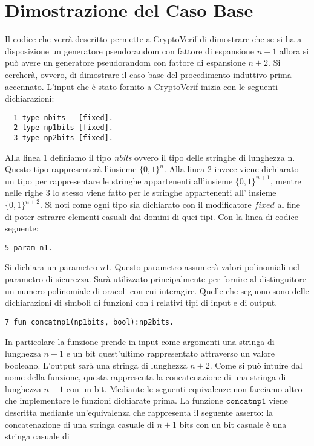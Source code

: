 \documentclass[a4paper,openright,twoside,12pt]{report}
\begin{document}
\newpage
\section{Dimostrazione del Caso Base}
Il codice che verr\`a descritto permette a CryptoVerif di dimostrare che se si ha a disposizione un generatore pseudorandom con fattore
di espansione $n+1$ allora si pu\`o avere un generatore pseudorandom con fattore di espansione $n+2$. 
Si cercher\`a, ovvero, di dimostrare il caso base del procedimento induttivo prima accennato.
L'input che \`e stato fornito a CryptoVerif inizia con le seguenti dichiarazioni:
\begin{verbatim}
  1 type nbits 	 [fixed].     
  2 type np1bits [fixed].   
  3 type np2bits [fixed].   
\end{verbatim}
Alla linea 1 definiamo il tipo \emph{nbits} ovvero il tipo delle stringhe di lunghezza n. Questo tipo rappresenter\`a l'insieme $\{0, 1\}^n$. Alla linea 2 invece viene dichiarato un tipo
per rappresentare le stringhe appartenenti all'insieme $\{0, 1\}^{n+1}$, mentre nelle righe 3 lo stesso viene fatto per le stringhe
appartenenti all' insieme $\{0, 1\}^{n+2}$. Si noti come ogni tipo sia dichiarato con il modificatore $fixed$ al fine di poter estrarre elementi casuali dai domini di quei tipi.
Con la linea di codice seguente:
\begin{verbatim}
5 param n1.
\end{verbatim}
Si dichiara un parametro $n1$. Questo parametro assumer\`a valori polinomiali nel parametro di sicurezza. 
Sar\`a utilizzato principalmente per fornire al distinguitore un numero polinomiale di oracoli con cui interagire.
Quelle che seguono sono delle dichiarazioni di simboli di funzioni con i relativi tipi di input e di output.
\begin{verbatim}  
7 fun concatnp1(np1bits, bool):np2bits.
\end{verbatim}
In particolare la funzione prende in input come argomenti una stringa di lunghezza $n+1$ e un bit quest'ultimo rappresentato attraverso
un valore booleano. L'output sar\`a una stringa di lunghezza $n+2$.
Come si pu\`o intuire dal nome della funzione, questa rappresenta la concatenazione di una stringa di lunghezza $n+1$ con un bit.
Mediante le seguenti equivalenze non facciamo altro che implementare le funzioni dichiarate prima.
La funzione $\texttt{concatnp1}$ viene descritta mediante un'equivalenza che rappresenta il seguente asserto:
la concatenazione di una stringa casuale di $n+1$ bits con un bit casuale \`e una stringa casuale di
\end{document}
